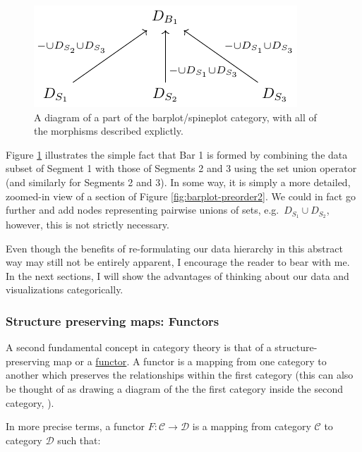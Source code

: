 \documentclass[
]{book}
\theoremstyle{definition}
\theoremstyle{definition}
\theoremstyle{definition}
\theoremstyle{definition}
\theoremstyle{remark}
\begin{document}
\begin{figure}

{\centering \includegraphics[width=1\linewidth,height=1\textheight]{./figures/barplot-preorder3} 

}

\caption{A diagram of a part of the barplot/spineplot category, with all of the morphisms described explictly.}\label{fig:barplot-preorder3}
\end{figure}

Figure \ref{fig:barplot-preorder3} illustrates the simple fact that Bar 1 is formed by combining the data subset of Segment 1 with those of Segments 2 and 3 using the set union operator (and similarly for Segments 2 and 3). In some way, it is simply a more detailed, zoomed-in view of a section of Figure \ref{fig:barplot-preorder2}. We could in fact go further and add nodes representing pairwise unions of sets, e.g.~\(D_{S_1} \cup D_{S_2}\), however, this is not strictly necessary.

Even though the benefits of re-formulating our data hierarchy in this abstract way may still not be entirely apparent, I encourage the reader to bear with me. In the next sections, I will show the advantages of thinking about our data and visualizations categorically.

\subsubsection{Structure preserving maps: Functors}\label{structure-preserving-maps-functors}

A second fundamental concept in category theory is that of a structure-preserving map or a \hyperref[functors]{functor}. A functor is a mapping from one category to another which preserves the relationships within the first category (this can also be thought of as drawing a diagram of the the first category inside the second category, ).

In more precise terms, a functor \(F: \mathcal{C} \to \mathcal{D}\) is a mapping from category \(\mathcal{C}\) to category \(\mathcal{D}\) such that:
\end{document}
